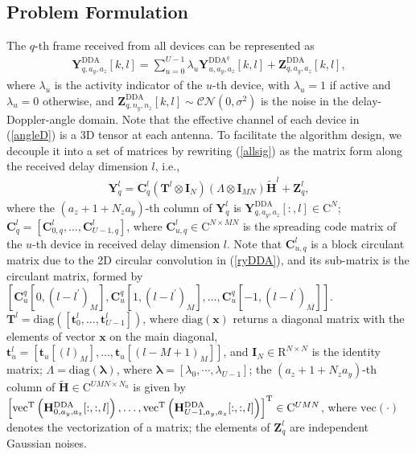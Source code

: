 \documentclass[conference]{IEEEtran}
\begin{document}
	\subsection{Problem Formulation}
	The $q$-th frame received from all devices can be represented as
	\begin{align}
		\label{allsig}
		\mathbf Y_{q,a_y, a_z}^{\mathrm{DDA}}[k, l] = \sum_{u=0}^{U-1} \lambda_u \mathbf Y_{u,a_y, a_z}^{\mathrm{DDA}^q}[k, l]+ \mathbf Z_{q,a_y, a_z}^{\mathrm{DDA}}[k, l],
	\end{align}
	where $\lambda_u$ is the activity indicator of the $u$-th device, with $\lambda_u = 1$ if active and $\lambda_u=0$ otherwise, and $\mathbf Z_{q,n_y, n_z}^{\mathrm{DDA}}[k, l] \sim \mathcal{CN}(0,\sigma^2)$ is the noise in the delay-Doppler-angle domain. Note that the effective channel of each device in (\ref{angleD}) is a 3D tensor at each antenna.  To facilitate the algorithm design, we decouple it into a set of matrices by rewriting (\ref{allsig}) as the matrix form along the received delay dimension $l$, i.e.,
	\begin{align}
	\label{qframe}
	\mathbf Y_q^l =  \mathbf C^l_q (\mathbf T^l \otimes \mathbf I_N )(\Lambda \otimes \mathbf{I}_{MN}) \tilde{\mathbf H}^l + \mathbf Z_q^l,
	\end{align}
	where the $(a_z+1+N_za_y)$-th column of $\mathbf Y^l_q$ is $\mathbf Y_{q,a_y, a_z}^{\mathrm{DDA}}[:,l] \in\mathrm{C}^{N}$; 
	$\mathbf C^l_q=[\mathbf C_{0,q}^l,\dots,\mathbf C_{U-1,q}^l]$, where $\mathbf C_{u,q}^l\in\mathrm{C}^{N\times MN}$ is the spreading code matrix of the $u$-th device in received delay dimension $l$. Note that $\mathbf C_{u,q}^l$ is a block circulant matrix due to the 2D circular convolution in (\ref{ryDDA}), 
	and its sub-matrix is the circulant matrix, formed by $[\mathbf C_{u}^q[0,(l-l^{\prime})_M],\mathbf C_{u}^q[1,(l-l^{\prime})_M],\dots,\mathbf C_{u}^q[-1,(l-l^{\prime})_M]]$. $\mathbf T^l = \mathrm{diag}([\mathbf t_0^l, \dots, \mathbf t_{U-1}^l])$, where $\mathrm{diag}(\mathbf x)$ returns a diagonal matrix with the elements of vector $\mathbf x$ on the main diagonal, $\mathbf t_u^l=[\mathbf t_u[(l)_M],\dots,\mathbf t_u[(l-M+1)_M]]$, and $\mathbf{I}_{N} \in \mathrm{R}^{N\times N}$ is the identity matrix;
	$\Lambda = \mathrm{diag}(\bm{\lambda})$, where $\bm{\lambda} = [\lambda_0,\cdots,\lambda_{U-1}]$; the $(a_z+1+N_za_y)$-th column of $\tilde{\mathbf H} \in \mathrm{C}^{UMN\times N_a}$ is given by $\left[\mathrm{vec}^{\text T}\left(\mathbf H^{\mathrm{DDA}}_{0,a_y,a_z}[:,:,l]\right),\dots,\mathrm{vec}^{\text T}\left(\mathbf H^{\mathrm{DDA}}_{U-1,a_y,a_z}[:,:,l]\right) \right]^{\text T} \in \mathrm{C}^{UMN}$, where $\mathrm{vec}(\cdot)$ denotes the vectorization of a matrix; the elements of $\mathbf Z^l_q$ are independent Gaussian noises. 
\end{document}
